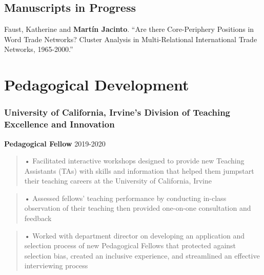 \documentclass[10pt,]{article}
\providecommand{\tightlist}{%
  \setlength{\itemsep}{0pt}\setlength{\parskip}{0pt}}
\renewenvironment{itemize}{
  \begin{list}{}{
    \setlength{\leftmargin}{1.5em}
  }
}{
  \end{list}
}
\begin{document}
\hypertarget{manuscripts-in-progress}{%
\subsection{Manuscripts in Progress}\label{manuscripts-in-progress}}

\begin{itemize}
\tightlist
\item
  Faust, Katherine and \textbf{Martín Jacinto}. ``Are there
  Core-Periphery Positions in Word Trade Networks? Cluster Analysis in
  Multi-Relational International Trade Networks, 1965-2000.''
\end{itemize}

\hypertarget{pedagogical-development}{%
\section{Pedagogical Development}\label{pedagogical-development}}

\hypertarget{university-of-california-irvines-division-of-teaching-excellence-and-innovation}{%
\subsubsection{University of California, Irvine's Division of Teaching
Excellence and
Innovation}\label{university-of-california-irvines-division-of-teaching-excellence-and-innovation}}

\textbf{Pedagogical Fellow} \hfill 2019-2020

\begin{quote}
• Facilitated interactive workshops designed to provide new Teaching
Assistants (TAs) with skills and information that helped them jumpstart
their teaching careers at the University of California, Irvine
\end{quote}

\begin{quote}
• Assessed fellows' teaching performance by conducting in-class
observation of their teaching then provided one-on-one consultation and
feedback
\end{quote}

\begin{quote}
• Worked with department director on developing an application and
selection process of new Pedagogical Fellows that protected against
selection bias, created an inclusive experience, and streamlined an
effective interviewing process
\end{quote}
\end{document}
